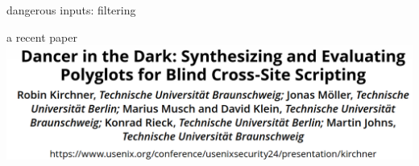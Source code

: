 \begin{frame}[fragile]{dangerous inputs: filtering}
\end{frame}

\begin{frame}{a recent paper}
\includegraphics[width=\textwidth]{kirchner-title}
\end{frame}
